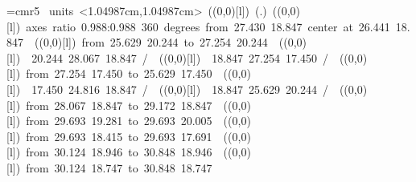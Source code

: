 %
%
\font\thinlinefont=cmr5
%
\begingroup\makeatletter\ifx\SetFigFont\undefined%
\gdef\SetFigFont#1#2#3#4#5{%
  \reset@font\fontsize{#1}{#2pt}%
  \fontfamily{#3}\fontseries{#4}\fontshape{#5}%
  \selectfont}%
\fi\endgroup%
\mbox{\beginpicture
\setcoordinatesystem units <1.04987cm,1.04987cm>
\unitlength=1.04987cm
\linethickness=1pt
\setplotsymbol ({\makebox(0,0)[l]{\tencirc{}}})
\setshadesymbol ({\thinlinefont .})
\setlinear
%
%
\linethickness=1pt
\setplotsymbol ({\makebox(0,0)[l]{\tencirc{}}})
{\color[rgb]{0,0,0}\ellipticalarc axes ratio  0.988:0.988  360 degrees 
	from 27.430 18.847 center at 26.441 18.847
}%
%
%
\linethickness=1pt
\setplotsymbol ({\makebox(0,0)[l]{\tencirc{}}})
{\color[rgb]{0,0,0}\putrule from 25.629 20.244 to 27.254 20.244
}%
%
%
\linethickness=1pt
\setplotsymbol ({\makebox(0,0)[l]{\tencirc{}}})
{\color[rgb]{0,0,0} 20.244 28.067 18.847 /
}%
%
%
\linethickness=1pt
\setplotsymbol ({\makebox(0,0)[l]{\tencirc{}}})
{\color[rgb]{0,0,0} 18.847 27.254 17.450 /
}%
%
%
\linethickness=1pt
\setplotsymbol ({\makebox(0,0)[l]{\tencirc{}}})
{\color[rgb]{0,0,0}\putrule from 27.254 17.450 to 25.629 17.450
}%
%
%
\linethickness=1pt
\setplotsymbol ({\makebox(0,0)[l]{\tencirc{}}})
{\color[rgb]{0,0,0} 17.450 24.816 18.847 /
}%
%
%
\linethickness=1pt
\setplotsymbol ({\makebox(0,0)[l]{\tencirc{}}})
{\color[rgb]{0,0,0} 18.847 25.629 20.244 /
}%
%
%
\linethickness=1pt
\setplotsymbol ({\makebox(0,0)[l]{\tencirc{}}})
{\color[rgb]{0,0,0}\putrule from 28.067 18.847 to 29.172 18.847
}%
%
%
\linethickness=1pt
\setplotsymbol ({\makebox(0,0)[l]{\tencirc{}}})
{\color[rgb]{0,0,0}\putrule from 29.693 19.281 to 29.693 20.005
}%
%
%
\linethickness=1pt
\setplotsymbol ({\makebox(0,0)[l]{\tencirc{}}})
{\color[rgb]{0,0,0}\putrule from 29.693 18.415 to 29.693 17.691
}%
%
%
\linethickness=1pt
\setplotsymbol ({\makebox(0,0)[l]{\tencirc{}}})
{\color[rgb]{0,0,0}\putrule from 30.124 18.946 to 30.848 18.946
}%
%
%
\linethickness=1pt
\setplotsymbol ({\makebox(0,0)[l]{\tencirc{}}})
{\color[rgb]{0,0,0}\putrule from 30.124 18.747 to 30.848 18.747
}}

